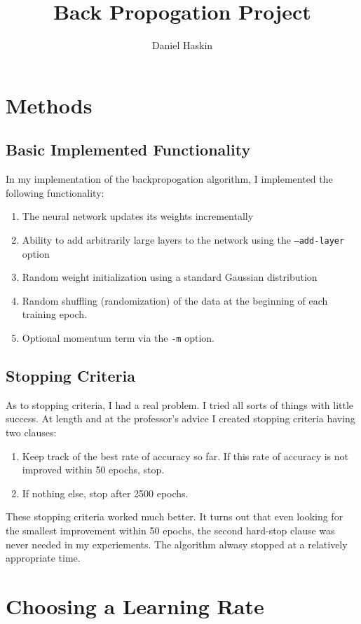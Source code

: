 \documentclass[12pt]{article}
\title{Back Propogation Project}
\author{Daniel Haskin}
\begin{document}
\maketitle
\section{Methods}
\subsection{Basic Implemented Functionality}
In my implementation of the backpropogation algorithm, I implemented
the following functionality:
\begin{enumerate}
    \item The neural network updates its weights incrementally
    \item Ability to add arbitrarily large layers to the network using the
        \texttt{--add-layer} option
    \item Random weight initialization using a standard Gaussian distribution
    \item Random shuffling (randomization) of the data at the beginning of each
        training epoch.
    \item Optional momentum term via the \texttt{-m} option.
\end{enumerate}
\subsection{Stopping Criteria}
As to stopping criteria, I had a real problem. I tried all sorts of things
with little success. At length and at the professor's advice I created stopping
criteria having two clauses:
\begin{enumerate}
    \item Keep track of the best rate of accuracy so far. If this rate of
        accuracy is not improved within 50 epochs, stop.
    \item If nothing else, stop after 2500 epochs.
\end{enumerate}
These stopping criteria worked much better. It turns out that even looking
for the smallest improvement within 50 epochs, the second hard-stop clause
was never needed in my experiements. The algorithm alwasy stopped at a
relatively appropriate time.
\section{Choosing a Learning Rate}
\end{document}
